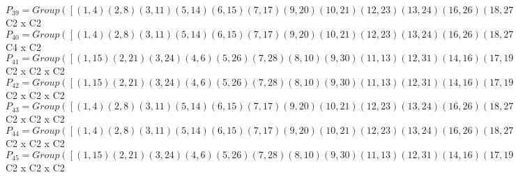 \documentclass[varwidth=\maxdimen,border=10]{standalone}
\begin{document}
\begin{tabular}
$P_{39} = Group( [ ( 1, 4)( 2, 8)( 3,11)( 5,14)( 6,15)( 7,17)( 9,20)(10,21)(12,23)(13,24)(16,26)(18,27)(19,28)(22,30)(25,31)(29,32), ( 1, 3)( 2, 7)( 4,11)( 5,12)( 6,13)( 8,17)( 9,18)(10,19)(14,23)(15,24)(16,25)(20,27)(21,28)(22,29)(26,31)(30,32) ] )\cong$ C2 x C2\ \\
$P_{40} = Group( [ ( 1, 4)( 2, 8)( 3,11)( 5,14)( 6,15)( 7,17)( 9,20)(10,21)(12,23)(13,24)(16,26)(18,27)(19,28)(22,30)(25,31)(29,32), ( 1,18,16,19)( 2,25,22, 3)( 4,27,26,28)( 5, 7, 6,29)( 8,31,30,11)( 9,13,10,12)(14,17,15,32)(20,24,21,23), ( 1,16)( 2,22)( 3,25)( 4,26)( 5, 6)( 7,29)( 8,30)( 9,10)(11,31)(12,13)(14,15)(17,32)(18,19)(20,21)(23,24)(27,28) ] )\cong$ C4 x C2\ \\
$P_{41} = Group( [ ( 1,15)( 2,21)( 3,24)( 4, 6)( 5,26)( 7,28)( 8,10)( 9,30)(11,13)(12,31)(14,16)(17,19)(18,32)(20,22)(23,25)(27,29), ( 1, 3)( 2, 7)( 4,11)( 5,12)( 6,13)( 8,17)( 9,18)(10,19)(14,23)(15,24)(16,25)(20,27)(21,28)(22,29)(26,31)(30,32), ( 1,16)( 2,22)( 3,25)( 4,26)( 5, 6)( 7,29)( 8,30)( 9,10)(11,31)(12,13)(14,15)(17,32)(18,19)(20,21)(23,24)(27,28) ] )\cong$ C2 x C2 x C2\ \\
$P_{42} = Group( [ ( 1,15)( 2,21)( 3,24)( 4, 6)( 5,26)( 7,28)( 8,10)( 9,30)(11,13)(12,31)(14,16)(17,19)(18,32)(20,22)(23,25)(27,29), ( 1, 3)( 2, 7)( 4,11)( 5,12)( 6,13)( 8,17)( 9,18)(10,19)(14,23)(15,24)(16,25)(20,27)(21,28)(22,29)(26,31)(30,32), ( 1, 5)( 2, 9)( 3,12)( 4,14)( 6,16)( 7,18)( 8,20)(10,22)(11,23)(13,25)(15,26)(17,27)(19,29)(21,30)(24,31)(28,32) ] )\cong$ C2 x C2 x C2\ \\
$P_{43} = Group( [ ( 1, 4)( 2, 8)( 3,11)( 5,14)( 6,15)( 7,17)( 9,20)(10,21)(12,23)(13,24)(16,26)(18,27)(19,28)(22,30)(25,31)(29,32), ( 1,13)( 2,19)( 3, 6)( 4,24)( 5,25)( 7,10)( 8,28)( 9,29)(11,15)(12,16)(14,31)(17,21)(18,22)(20,32)(23,26)(27,30), ( 1, 5)( 2, 9)( 3,12)( 4,14)( 6,16)( 7,18)( 8,20)(10,22)(11,23)(13,25)(15,26)(17,27)(19,29)(21,30)(24,31)(28,32) ] )\cong$ C2 x C2 x C2\ \\
$P_{44} = Group( [ ( 1, 4)( 2, 8)( 3,11)( 5,14)( 6,15)( 7,17)( 9,20)(10,21)(12,23)(13,24)(16,26)(18,27)(19,28)(22,30)(25,31)(29,32), ( 1, 3)( 2, 7)( 4,11)( 5,12)( 6,13)( 8,17)( 9,18)(10,19)(14,23)(15,24)(16,25)(20,27)(21,28)(22,29)(26,31)(30,32), ( 1,16)( 2,22)( 3,25)( 4,26)( 5, 6)( 7,29)( 8,30)( 9,10)(11,31)(12,13)(14,15)(17,32)(18,19)(20,21)(23,24)(27,28) ] )\cong$ C2 x C2 x C2\ \\
$P_{45} = Group( [ ( 1,15)( 2,21)( 3,24)( 4, 6)( 5,26)( 7,28)( 8,10)( 9,30)(11,13)(12,31)(14,16)(17,19)(18,32)(20,22)(23,25)(27,29), ( 1,13)( 2,19)( 3, 6)( 4,24)( 5,25)( 7,10)( 8,28)( 9,29)(11,15)(12,16)(14,31)(17,21)(18,22)(20,32)(23,26)(27,30), ( 1, 5)( 2, 9)( 3,12)( 4,14)( 6,16)( 7,18)( 8,20)(10,22)(11,23)(13,25)(15,26)(17,27)(19,29)(21,30)(24,31)(28,32) ] )\cong$ C2 x C2 x C2\ \\

\end{tabular}
\end{document}
